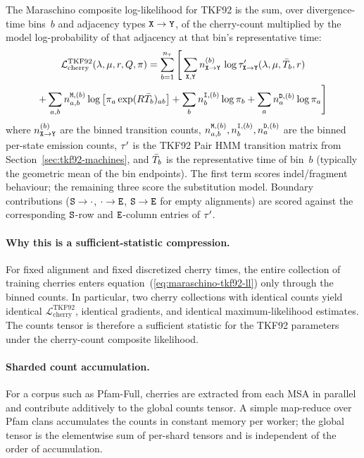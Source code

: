 The Maraschino composite log-likelihood for TKF92 is the sum, over
divergence-time bins~$b$ and adjacency types ${\tt X} \to {\tt Y}$, of
the cherry-count multiplied by the model log-probability of that
adjacency at that bin's representative time:
\begin{multline}
\mathcal{L}_{\text{cherry}}^{\mathrm{TKF92}}(\lambda,\mu,r,Q,\pi)
=
\sum_{b=1}^{n_\tau}\Bigg[
\sum_{{\tt X},{\tt Y}}
n^{(b)}_{{\tt X}\to{\tt Y}}\,
\log \tau'_{{\tt X}\to{\tt Y}}(\lambda,\mu,\bar{T}_b,r)
\\
+
\sum_{a,b} n^{{\tt M},(b)}_{a,b}
\log\big[ \pi_a \exp(R \bar{T}_b)_{ab} \big]
+
\sum_b n^{{\tt I},(b)}_b \log \pi_b
+
\sum_a n^{{\tt D},(b)}_a \log \pi_a
\Bigg]
\label{eq:maraschino-tkf92-ll}
\end{multline}
where $n^{(b)}_{{\tt X}\to{\tt Y}}$ are the binned transition counts,
$n^{{\tt M},(b)}_{a,b}, n^{{\tt I},(b)}_b, n^{{\tt D},(b)}_a$
are the binned per-state emission counts,
$\tau'$ is the TKF92 Pair HMM transition matrix from
Section~\ref{sec:tkf92-machines},
and $\bar{T}_b$ is the representative time of bin~$b$
(typically the geometric mean of the bin endpoints).
The first term scores indel/fragment behaviour;
the remaining three score the substitution model.
Boundary contributions (${\tt S}\to\cdot$, $\cdot\to{\tt E}$, ${\tt S}\to{\tt E}$
for empty alignments) are scored against the corresponding
${\tt S}$-row and ${\tt E}$-column entries of $\tau'$.

\paragraph{Why this is a sufficient-statistic compression.}
For fixed alignment and fixed discretized cherry times, the entire
collection of training cherries enters
equation~(\ref{eq:maraschino-tkf92-ll}) only through the binned
counts.  In particular, two cherry collections with identical counts
yield identical $\mathcal{L}_{\text{cherry}}^{\mathrm{TKF92}}$,
identical gradients, and identical maximum-likelihood estimates.
The counts tensor is therefore a sufficient statistic for the
TKF92 parameters under the cherry-count composite likelihood.

\paragraph{Sharded count accumulation.}
For a corpus such as Pfam-Full, cherries are extracted from each MSA
in parallel and contribute additively to the global counts tensor.
A simple map-reduce over Pfam clans accumulates the counts in
constant memory per worker; the global tensor is the
elementwise sum of per-shard tensors and is independent of the order
of accumulation.

